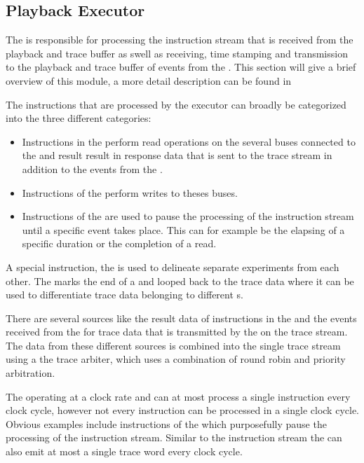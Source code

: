 \subsection{Playback Executor}\label{sec:pb_exec}
The \pbexec{} is responsible for processing the instruction stream that is received from the playback and trace buffer as swell as receiving, time stamping and transmission to the playback and trace buffer of events from the \ASIC{}. This section will give a brief overview of this module, a more detail description can be found in \autocite{ref:pb_exec}

The instructions that are processed by the executor can broadly be categorized into the three different categories:
\begin{itemize}
\item Instructions in the \readCat{} perform read operations on the several buses connected to the \pbexec{} and result result in response data that is sent to the trace stream in addition to the events from the \ASIC{}.
\item Instructions of the \writeCat{} perform writes to theses buses.
\item Instructions of the \waitCat{} are used to pause the processing of the instruction stream until a specific event takes place. This can for example be the elapsing of a specific duration or the completion of a read.
\end{itemize}
A special instruction, the \haltInstr{} is used to delineate separate experiments from each other. The \haltInstr{} marks the end of a \PlaybackProgram{} and looped back to the trace data where it can be used to differentiate trace data belonging to different \PlaybackProgram{}s.

There are several sources like the result data of instructions in the \readCat{} and the events received from the \ASIC{} for trace data that is transmitted by the \pbexec{} on the trace stream. The data from these different sources is combined into the single trace stream using a the trace arbiter, which uses a combination of round robin and priority arbitration.

The \pbexec{} operating at a \pbExecClock{} clock rate and can at most process a single instruction every clock cycle, however not every instruction can be processed in a single clock cycle. Obvious examples include instructions of the \waitCat{} which purposefully pause the processing of the instruction stream. Similar to the instruction stream the \pbexec{} can also emit at most a single trace word every clock cycle.

